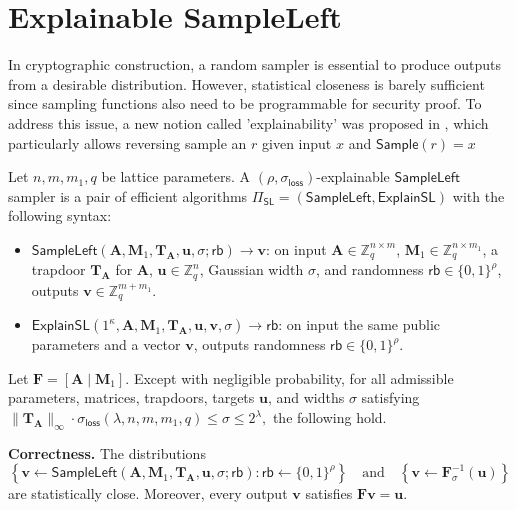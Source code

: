 \section{Explainable SampleLeft}
In cryptographic construction, a random sampler is essential to produce outputs from a desirable distribution. However, statistical closeness is barely sufficient since sampling functions also need to be programmable for security proof. To address this issue, a new notion called 'explainability' was proposed in \cite{TCC:LuWat22}, which particularly allows reversing sample an $r$ given input $x$ and $\mathsf{Sample}(r) = x$
\begin{definition}
Let $n,m,m_1,q$ be lattice parameters. A $(\rho,\sigma_{\mathsf{loss}})$-explainable $\mathsf{SampleLeft}$ sampler is a pair of efficient algorithms
$
\Pi_{\mathsf{SL}}=(\mathsf{SampleLeft},\mathsf{ExplainSL})
$
with the following syntax:
\begin{itemize}
    \item $\mathsf{SampleLeft}(\mathbf A,\mathbf M_1,\mathbf T_{\mathbf A},\mathbf u,\sigma;\mathsf{rb}) \to \mathbf v$:
    on input $\mathbf A\in\mathbb Z_q^{n\times m}$, $\mathbf M_1\in\mathbb Z_q^{n\times m_1}$, a trapdoor $\mathbf T_{\mathbf A}$  for $\mathbf A$, $\mathbf u\in\mathbb Z_q^n$, Gaussian width $\sigma$, and randomness $\mathsf{rb}\in\{0,1\}^{\rho}$, outputs $\mathbf v\in\mathbb Z_q^{m+m_1}$.

    \item $\mathsf{ExplainSL}(1^\kappa,\mathbf A,\mathbf M_1,\mathbf T_{\mathbf A},\mathbf u,\mathbf v,\sigma) \to \mathsf{rb}$:
    on input the same public parameters and a vector $\mathbf v$, outputs randomness $\mathsf{rb}\in\{0,1\}^{\rho}$.
\end{itemize}

Let $\mathbf F=[\mathbf A\mid \mathbf M_1]$. Except with negligible probability, for all admissible parameters, matrices, trapdoors, targets $\mathbf u$, and widths $\sigma$ satisfying
$
\|\mathbf T_{\mathbf A}\|_{\infty}\cdot \sigma_{\mathsf{loss}}(\lambda,n,m,m_1,q)
\leq
\sigma
\leq
2^\lambda,
$
the following hold.

\textbf{Correctness.} The distributions
$$
\left\{
\mathbf v \leftarrow
\mathsf{SampleLeft}(\mathbf A,\mathbf M_1,\mathbf T_{\mathbf A},\mathbf u,\sigma;\mathsf{rb})
:
\mathsf{rb}\leftarrow\{0,1\}^{\rho}
\right\}
\quad\text{and}\quad
\left\{
\mathbf v \leftarrow \mathbf F_{\sigma}^{-1}(\mathbf u)
\right\}
$$
are statistically close. Moreover, every output $\mathbf v$ satisfies $\mathbf F\mathbf v=\mathbf u$.


\end{definition}
